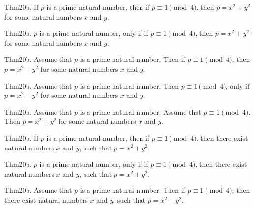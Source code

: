 \documentclass{article}
\begin{document}
Thm20b. If $p$ is a prime natural number, then if $p \equiv 1 \pmod{ 4}$, then $p = x ^{ 2}+ y ^{ 2}$ for some natural numbers $x$ and $y$.

Thm20b. $p$ is a prime natural number, only if if $p \equiv 1 \pmod{ 4}$, then $p = x ^{ 2}+ y ^{ 2}$ for some natural numbers $x$ and $y$.

Thm20b. Assume that $p$ is a prime natural number. Then if $p \equiv 1 \pmod{ 4}$, then $p = x ^{ 2}+ y ^{ 2}$ for some natural numbers $x$ and $y$.

Thm20b. Assume that $p$ is a prime natural number. Then $p \equiv 1 \pmod{ 4}$, only if $p = x ^{ 2}+ y ^{ 2}$ for some natural numbers $x$ and $y$.

Thm20b. Assume that $p$ is a prime natural number. Assume that $p \equiv 1 \pmod{ 4}$. Then $p = x ^{ 2}+ y ^{ 2}$ for some natural numbers $x$ and $y$.

Thm20b. If $p$ is a prime natural number, then if $p \equiv 1 \pmod{ 4}$, then there exist natural numbers $x$ and $y$, such that $p = x ^{ 2}+ y ^{ 2}$.

Thm20b. $p$ is a prime natural number, only if if $p \equiv 1 \pmod{ 4}$, then there exist natural numbers $x$ and $y$, such that $p = x ^{ 2}+ y ^{ 2}$.

Thm20b. Assume that $p$ is a prime natural number. Then if $p \equiv 1 \pmod{ 4}$, then there exist natural numbers $x$ and $y$, such that $p = x ^{ 2}+ y ^{ 2}$.
\end{document}
